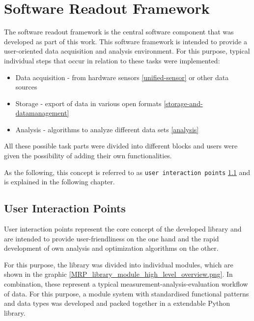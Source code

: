 \hypertarget{software-readout-framework}{%
\chapter{Software Readout Framework}\label{software-readout-framework}}

The software readout framework is the central software component that
was developed as part of this work. This software framework is intended
to provide a user-oriented data acquisition and analysis environment.
For this purpose, typical individual steps that occur in relation to
these tasks were implemented:

\begin{itemize}
\tightlist
\item
  Data acquisition - from hardware sensors \ref{unified-sensor} or other
  data sources
\item
  Storage - export of data in various open formats
  \ref{storage-and-datamanagement}
\item
  Analysis - algorithms to analyze different data sets \ref{analysis}
\end{itemize}

All these possible task parts were divided into different blocks and
users were given the possibility of adding their own functionalities.

As the following, this concept is referred to as
\passthrough{\lstinline!user interaction points!}
\ref{user-interaction-points} and is explained in the following chapter.

\hypertarget{user-interaction-points}{%
\section{User Interaction Points}\label{user-interaction-points}}

User interaction points represent the core concept of the developed
library and are intended to provide user-friendliness on the one hand
and the rapid development of own analysis and optimization algorithms on
the other.

For this purpose, the library was divided into individual modules, which
are shown in the graphic
\ref{MRP_library_module_high_level_overview.png}. In combination, these
represent a typical measurement-analysis-evaluation workflow of data.
For this purpose, a module system with standardised functional patterns
and data types was developed and packed together in a extendable Python
library.


